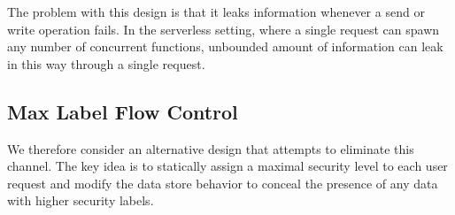 The problem with this design is that it leaks information whenever a send or write operation fails. In the serverless setting, where a single request can spawn any number of concurrent functions, unbounded amount of information can leak in this way through a single request.


\subsection{Max Label Flow Control} %
\label{sub:max_label_flow_control}

We therefore consider an alternative design that attempts to eliminate this channel. The key idea is to statically assign a maximal security level to each user request and modify the data store behavior to conceal the presence of any data with higher security labels.


